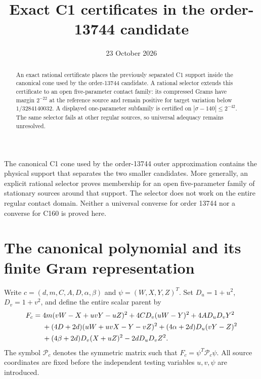 \documentclass[11pt]{article}
\title{Exact C1 certificates in the order-13744 candidate}
\author{}
\date{23 October 2026}
\begin{document}
\maketitle
\begin{abstract}
An exact rational certificate places the previously separated C1 support
inside the canonical cone used by the order-13744 candidate.  A rational
selector extends this certificate to an open five-parameter contact family:
its compressed Grams have margin $2^{-22}$ at the reference source and
remain positive for target variation below $1/3284140032$.
A displayed one-parameter subfamily is certified on
$|\sigma-140|\leq2^{-42}$.  The same selector fails at other regular
sources, so universal adequacy remains unresolved.
\end{abstract}

The canonical C1 cone used by the order-13744 outer approximation contains
the physical support that separates the two smaller candidates.  More
generally, an explicit rational selector proves membership for an open
five-parameter family of stationary sources around that support.  The
selector does not work on the entire regular contact domain.  Neither a
universal converse for order 13744 nor a converse for C160 is proved here.

\section{The canonical polynomial and its finite Gram representation}

Write $c=(d,m,C,A,D,\alpha,\beta)$ and $\psi=(W,X,Y,Z)^T$.
Set $D_u=1+u^2$, $D_v=1+v^2$, and define the entire scalar parent by
\begin{align}
 F_c={}&4m(vW-X+uvY-uZ)^2+4CD_v(uW-Y)^2
             +4AD_uD_vY^2 \notag\\
 &+(4D+2d)(uW+uvX-Y-vZ)^2
 +(4\alpha+2d)D_u(vY-Z)^2 \notag\\
 &+(4\beta+2d)D_v(X+uZ)^2-2dD_uD_vZ^2.
 \label{eq:parent}
\end{align}
The symbol $\mathcal P_c$ denotes the symmetric matrix such that
$F_c=\psi^T\mathcal P_c\psi$.  All source coordinates are fixed before
the independent testing variables $u,v,\psi$ are introduced.
\end{document}

